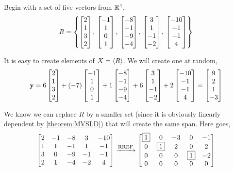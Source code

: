 \documentclass{ximera}
\begin{document}
\begin{example}
  Begin with a set of five vectors from $\mathbb{R}^{4}$,
  \[
    R=\left\{
      \begin{bmatrix} 2 \\ 1 \\ 3 \\ 2 \end{bmatrix},\,
      \begin{bmatrix} -1 \\ 1 \\ 0 \\ 1 \end{bmatrix},\,
      \begin{bmatrix} -8 \\ -1 \\ -9 \\ -4 \end{bmatrix},\,
      \begin{bmatrix} 3 \\ 1 \\ -1 \\ -2 \end{bmatrix},\,
      \begin{bmatrix} -10 \\ -1 \\ -1 \\ 4\end{bmatrix}
    \right\}
  \]
  
  It is easy to create elements of $X=\left\langle R\right\rangle$.  We will create one at random,
  \[
    \mathbf{y}=
    6\begin{bmatrix} 2 \\ 1 \\ 3 \\ 2 \end{bmatrix}+
    (-7)\begin{bmatrix} -1 \\ 1 \\ 0 \\ 1 \end{bmatrix}+
    1\begin{bmatrix} -8 \\ -1 \\ -9 \\ -4 \end{bmatrix}+
    6\begin{bmatrix} 3 \\ 1 \\ -1 \\ -2 \end{bmatrix}+
    2\begin{bmatrix} -10 \\ -1 \\ -1 \\ 4\end{bmatrix}
    =
    \begin{bmatrix}9\\2\\1\\-3\end{bmatrix}
  \]
  
  We know we can replace $R$ by a smaller set (since it is obviously
  linearly dependent by \ref{theorem:MVSLD}) that will create the same
  span.  Here goes,
  \[
    \begin{bmatrix}
      2 & -1 & -8 & 3 & -10 \\
      1 & 1 & -1 & 1 & -1 \\
      3 & 0 & -9 & -1 & -1 \\
      2 & 1 & -4 & -2 & 4
    \end{bmatrix}
    \xrightarrow{\text{RREF}}
    \begin{bmatrix}
      \fbox{1} & 0 & -3 & 0 & -1 \\
      0 & \fbox{1} & 2 & 0 & 2 \\
      0 & 0 & 0 & \fbox{1} & -2 \\
      0 & 0 & 0 & 0 & 0
    \end{bmatrix}
  \]
  

\end{example}
\end{document}
